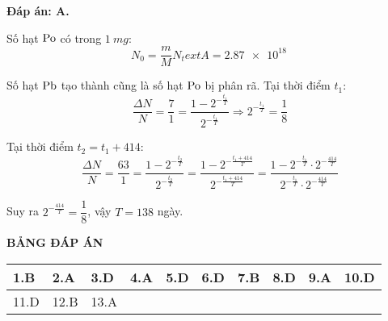 \begin{enumerate}[label=\bfseries Câu \arabic*:]
\loigiai
{		\textbf{Đáp án: A.}
	
	Số hạt $\ce{Po}$ có trong $\SI{1}{mg}$:
	$$N_0 = \dfrac{m}{M} N_text{A} = \SI{2.87e18}{}$$
	
	Số hạt $\ce{Pb}$ tạo thành cũng là số hạt $\ce{Po}$ bị phân rã. Tại thời điểm $t_1$:
	$$\dfrac{\Delta N}{N} = \dfrac{7}{1} = \dfrac{1-2^{-\frac{t_1}{T}}}{2^{-\frac{t_1}{T}}} \Rightarrow 2^{-\frac{t_1}{T}} = \dfrac{1}{8}$$
	
	Tại thời điểm $t_2=t_1+414$:
	$$\dfrac{\Delta N}{N} = \dfrac{63}{1} = \dfrac{1-2^{-\frac{t_2}{T}}}{2^{-\frac{t_2}{T}}}=\dfrac{1-2^{-\frac{t_1+414}{T}}}{2^{-\frac{t_1+414}{T}}}=\dfrac{1-2^{-\frac{t_1}{T}}\cdot 2^{-{\frac{414}{T}}}}{2^{-\frac{t_1}{T}}\cdot 2^{-{\frac{414}{T}}}}$$
	
	Suy ra $2^{-{\frac{414}{T}}} = \dfrac{1}{8}$, vậy $T=138$ ngày.
	
}


\end{enumerate}
\loigiai
{
	\begin{center}
		\textbf{BẢNG ĐÁP ÁN}
	\end{center}
	\begin{center}
		\begin{tabular}{|m{2.8em}|m{2.8em}|m{2.8em}|m{2.8em}|m{2.8em}|m{2.8em}|m{2.8em}|m{2.8em}|m{2.8em}|m{2.8em}|}
			\hline
			1.B  & 2.A  & 3.D  & 4.A  & 5.D  & 6.D  & 7.B & 8.D & 9.A & 10.D \\
			\hline
			11.D  & 12.B  & 13.A  & & & & & & & \\
			\hline
			
		\end{tabular}
	\end{center}
}

\whiteBGstarEnd